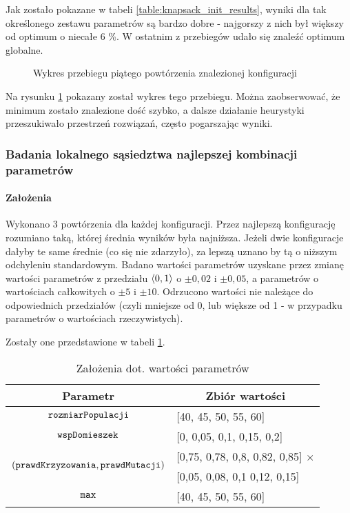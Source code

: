 \documentclass[./FM_mgr.tex]{subfiles}
\begin{document}
Jak zostało pokazane w tabeli \ref{table:knapsack_init_results}, wyniki dla tak określonego zestawu parametrów są bardzo dobre - najgorszy z nich był większy od optimum o niecałe 6 \%.
W ostatnim z przebiegów udało się znaleźć optimum globalne.

\begin{figure}[h]
	\centering
	\caption{Wykres przebiegu piątego powtórzenia znalezionej konfiguracji \label{figure:knapsack_init_example}}
\end{figure}

Na rysunku \ref{figure:knapsack_init_example} pokazany został wykres tego przebiegu.
Można zaobserwować, że minimum zostało znalezione dość szybko, a dalsze działanie heurystyki przeszukiwało przestrzeń rozwiązań, często pogarszając wyniki.


\subsubsection{Badania lokalnego sąsiedztwa najlepszej kombinacji parametrów}

\paragraph{Założenia} Wykonano 3 powtórzenia dla każdej konfiguracji.
Przez najlepszą konfigurację rozumiano taką, której średnia wyników była najniższa.
Jeżeli dwie konfiguracje dałyby te same średnie (co się nie zdarzyło), za lepszą uznano by tą o niższym odchyleniu standardowym.
Badano wartości parametrów uzyskane przez zmianę wartości parametrów z przedziału $\langle0, 1\rangle$ o $\pm0,02$ i $\pm0,05$, a parametrów o wartościach całkowitych o $\pm5$ i $\pm10$. 
Odrzucono wartości nie należące do odpowiednich przedziałów (czyli mniejsze od 0, lub większe od 1 - w przypadku parametrów o wartościach rzeczywistych).

Zostały one przedstawione w tabeli \ref{config:knapsack_tweak_params}.

\begin{table}
	\caption{Założenia dot. wartości parametrów \label{config:knapsack_tweak_params}}
	\centering
	\begin{tabular}{|c|l|}
		\hline
		\textbf{Parametr} & \multicolumn{1}{c|}{\textbf{Zbiór wartości}} \\
		\hline
		\hline
		$\mathtt{rozmiarPopulacji}$ & [40, 45, 50, 55, 60] \\
		\hline
		$\mathtt{wspDomieszek}$ & [0, 0,05, 0,1, 0,15, 0,2]\\
		\hline
		\multirow{2}{*}{$(\mathtt{prawdKrzyzowania}, \mathtt{prawdMutacji})$} & [0,75, 0,78, 0,8, 0,82, 0,85] $\times$ \\ 
		& [0,05, 0,08, 0,1 0,12, 0,15]  \\
		\hline
		$\mathtt{max}$ & [40, 45, 50, 55, 60] \\
		\hline		
	\end{tabular}
\end{table}
\end{document}
